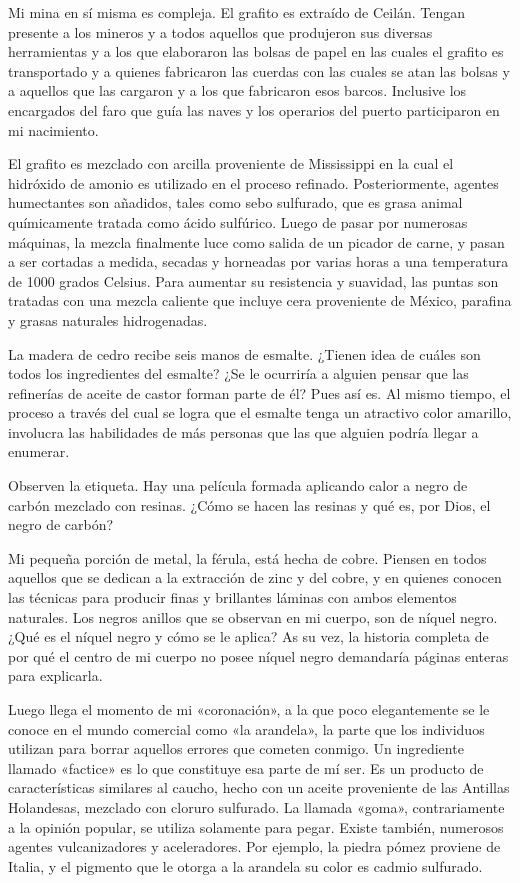 \documentclass[12pt,a4paper,twoside]{book}
\begin{document}
Mi mina en sí misma es compleja. El grafito es extraído de Ceilán. Tengan presente a los mineros y a todos aquellos que produjeron sus diversas herramientas y a los que elaboraron las bolsas de papel en las cuales el grafito es transportado y a quienes fabricaron las cuerdas con las cuales se atan las bolsas y a aquellos que las cargaron y a los que fabricaron esos barcos. Inclusive los encargados del faro que guía las naves y los operarios del puerto participaron en mi nacimiento.

El grafito es mezclado con arcilla proveniente de Mississippi en la cual el hidróxido de amonio es utilizado en el proceso refinado. Posteriormente, agentes humectantes son añadidos, tales como sebo sulfurado, que es grasa animal químicamente tratada como ácido sulfúrico. Luego de pasar por numerosas máquinas, la mezcla finalmente luce como salida de un picador de carne, y pasan a ser cortadas a medida, secadas y horneadas por varias horas a una temperatura de 1000 grados Celsius. Para aumentar su resistencia y suavidad, las puntas son tratadas con una mezcla caliente que incluye cera proveniente de México, parafina y grasas naturales hidrogenadas.

La madera de cedro recibe seis manos de esmalte. ¿Tienen idea de cuáles son todos los ingredientes del esmalte? ¿Se le ocurriría a alguien pensar que las refinerías de aceite de castor forman parte de él? Pues así es. Al mismo tiempo, el proceso a través del cual se logra que el esmalte tenga un atractivo color amarillo, involucra las habilidades de más personas que las que alguien podría llegar a enumerar.

Observen la etiqueta. Hay una película formada aplicando calor a negro de carbón mezclado con resinas. ¿Cómo se hacen las resinas y qué es, por Dios, el negro de carbón?

Mi pequeña porción de metal, la férula, está hecha de cobre. Piensen en todos aquellos que se dedican a la extracción de zinc y del cobre, y en quienes conocen las técnicas para producir finas y brillantes láminas con ambos elementos naturales. Los negros anillos que se observan en mi cuerpo, son de níquel negro. ¿Qué es el níquel negro y cómo se le aplica? As su vez, la historia completa de por qué el centro de mi cuerpo no posee níquel negro demandaría páginas enteras para explicarla.

Luego llega el momento de mi «coronación», a la que poco elegantemente se le conoce en el mundo comercial como «la arandela», la parte que los individuos utilizan para borrar aquellos errores que cometen conmigo. Un ingrediente llamado «factice» es lo que constituye esa parte de mí ser. Es un producto de características similares al caucho, hecho con un aceite proveniente de las Antillas Holandesas, mezclado con cloruro sulfurado. La llamada «goma», contrariamente a la opinión popular, se utiliza solamente para pegar. Existe también, numerosos agentes vulcanizadores y aceleradores. Por ejemplo, la piedra pómez proviene de Italia, y el pigmento que le otorga a la arandela su color es cadmio sulfurado.
\end{document}
